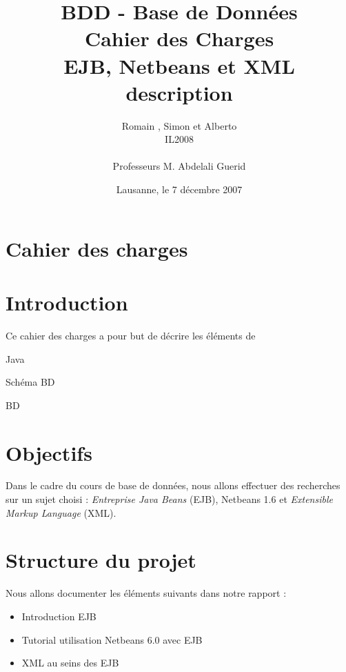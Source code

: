 \documentclass[a4paper, 11pt]{article}
\title{ %
\small{BDD - Base de Données} \\ \vspace{2cm}
\huge{Cahier des Charges} \\ \vspace{1cm} 
EJB, Netbeans et XML\\ 
\small{description}}
\author{Romain \bsc{de Wolff}, Simon \bsc{Hintermann} et Alberto \bsc{Asuero Arroyo}\\ IL2008 \\ \vspace{2cm} \\ Professeurs M. Abdelali Guerid \vspace{2cm} 
}
\date{Lausanne, le 7 décembre 2007}  %
\begin{document}
\maketitle
\thispagestyle{empty} %
\newpage
 \setcounter{page}{1} 

{\setlength{\baselineskip}{1.2\baselineskip}
\parskip=12pt
\section*{Cahier des charges} 

\section{Introduction}

	Ce cahier des charges a pour but de décrire les éléments de

	Java
	
	Schéma BD
	
	BD

\section{Objectifs}

	Dans le cadre du cours de base de données, nous allons effectuer des recherches sur un sujet choisi : \emph{Entreprise Java Beans} (EJB), Netbeans 1.6 et \emph{Extensible Markup Language} (XML). 

\section{Structure du projet}

	Nous allons documenter les éléments suivants dans notre rapport : 
	
	\begin{itemize}
		\item Introduction EJB
		\item Tutorial utilisation Netbeans 6.0 avec EJB
		\item XML au seins des EJB
	\end{itemize}
	
}
\end{document}
